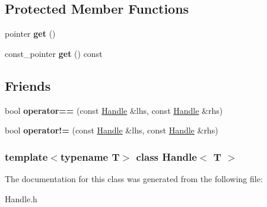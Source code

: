 \subsection*{\-Protected \-Member \-Functions}
\begin{DoxyCompactItemize}
\item 
\hypertarget{classHandle_ac8d3293e5dd407a126726e6f9f6dcc5e}{pointer {\bfseries get} ()}\label{classHandle_ac8d3293e5dd407a126726e6f9f6dcc5e}

\item 
\hypertarget{classHandle_a43f144b815aa32fe2f2bf28627ed341b}{const\-\_\-pointer {\bfseries get} () const }\label{classHandle_a43f144b815aa32fe2f2bf28627ed341b}

\end{DoxyCompactItemize}
\subsection*{\-Friends}
\begin{DoxyCompactItemize}
\item 
\hypertarget{classHandle_a8a1b1362bff49cc0f4a7a0792cf5f2bd}{bool {\bfseries operator==} (const \hyperlink{classHandle}{\-Handle} \&lhs, const \hyperlink{classHandle}{\-Handle} \&rhs)}\label{classHandle_a8a1b1362bff49cc0f4a7a0792cf5f2bd}

\item 
\hypertarget{classHandle_acd893d8ba3565c973c9f6ec1d8c9b512}{bool {\bfseries operator!=} (const \hyperlink{classHandle}{\-Handle} \&lhs, const \hyperlink{classHandle}{\-Handle} \&rhs)}\label{classHandle_acd893d8ba3565c973c9f6ec1d8c9b512}

\end{DoxyCompactItemize}
\subsubsection*{template$<$typename \-T$>$ class Handle$<$ T $>$}



\-The documentation for this class was generated from the following file\-:\begin{DoxyCompactItemize}
\item 
\-Handle.\-h\end{DoxyCompactItemize}
